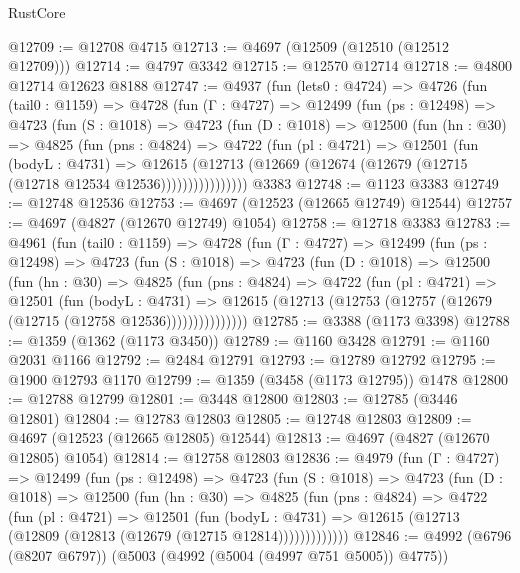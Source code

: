 \begin{lexlean}{RustCore}
\begin{coremodule}
@12709 := @12708 @4715
@12713 := @4697 (@12509 (@12510 (@12512 @12709)))
@12714 := @4797 @3342
@12715 := @12570 @12714
@12718 := @4800 @12714 @12623 @8188
@12747 := @4937
    (fun (lets0 : @4724) =>
    @4726
      (fun (tail0 : @1159) =>
      @4728
        (fun (Γ : @4727) =>
        @12499
          (fun (ps : @12498) =>
          @4723
            (fun (S : @1018) =>
            @4723
              (fun (D : @1018) =>
              @12500
                (fun (hn : @30) =>
                @4825
                  (fun (pns : @4824) =>
                  @4722
                    (fun (pl : @4721) =>
                    @12501
                      (fun (bodyL : @4731) =>
                      @12615
                        (@12713
                          (@12669 (@12674 (@12679 (@12715 (@12718 @12534 @12536))))))))))))))))
    @3383
@12748 := @1123 @3383
@12749 := @12748 @12536
@12753 := @4697 (@12523 (@12665 @12749) @12544)
@12757 := @4697 (@4827 (@12670 @12749) @1054)
@12758 := @12718 @3383
@12783 := @4961
    (fun (tail0 : @1159) =>
    @4728
      (fun (Γ : @4727) =>
      @12499
        (fun (ps : @12498) =>
        @4723
          (fun (S : @1018) =>
          @4723
            (fun (D : @1018) =>
            @12500
              (fun (hn : @30) =>
              @4825
                (fun (pns : @4824) =>
                @4722
                  (fun (pl : @4721) =>
                  @12501
                    (fun (bodyL : @4731) =>
                    @12615 (@12713 (@12753 (@12757 (@12679 (@12715 (@12758 @12536)))))))))))))))
@12785 := @3388 (@1173 @3398)
@12788 := @1359 (@1362 (@1173 @3450))
@12789 := @1160 @3428
@12791 := @1160 @2031 @1166
@12792 := @2484 @12791
@12793 := @12789 @12792
@12795 := @1900 @12793 @1170
@12799 := @1359 (@3458 (@1173 @12795)) @1478
@12800 := @12788 @12799
@12801 := @3448 @12800
@12803 := @12785 (@3446 @12801)
@12804 := @12783 @12803
@12805 := @12748 @12803
@12809 := @4697 (@12523 (@12665 @12805) @12544)
@12813 := @4697 (@4827 (@12670 @12805) @1054)
@12814 := @12758 @12803
@12836 := @4979
    (fun (Γ : @4727) =>
    @12499
      (fun (ps : @12498) =>
      @4723
        (fun (S : @1018) =>
        @4723
          (fun (D : @1018) =>
          @12500
            (fun (hn : @30) =>
            @4825
              (fun (pns : @4824) =>
              @4722
                (fun (pl : @4721) =>
                @12501
                  (fun (bodyL : @4731) =>
                  @12615 (@12713 (@12809 (@12813 (@12679 (@12715 @12814)))))))))))))
@12846 := @4992 (@6796 (@8207 @6797)) (@5003 (@4992 (@5004 (@4997 @751 @5005)) @4775))

\end{coremodule}
\end{lexlean}
